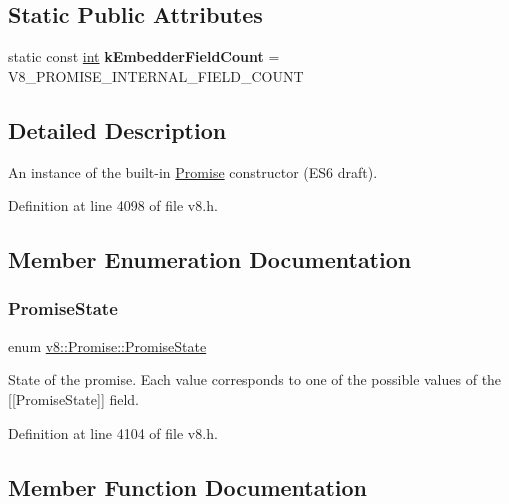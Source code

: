 \subsection*{Static Public Attributes}
\begin{DoxyCompactItemize}
\item 
\mbox{\label{classv8_1_1Promise_ab4302ae258f4405f871e24ec4b0ce618}} 
static const \mbox{\hyperlink{classint}{int}} {\bfseries k\+Embedder\+Field\+Count} = V8\+\_\+\+P\+R\+O\+M\+I\+S\+E\+\_\+\+I\+N\+T\+E\+R\+N\+A\+L\+\_\+\+F\+I\+E\+L\+D\+\_\+\+C\+O\+U\+NT
\end{DoxyCompactItemize}


\subsection{Detailed Description}
An instance of the built-\/in \mbox{\hyperlink{classv8_1_1Promise}{Promise}} constructor (E\+S6 draft). 

Definition at line 4098 of file v8.\+h.



\subsection{Member Enumeration Documentation}
\mbox{\label{classv8_1_1Promise_a0c357b9d99a634f98a5a203b0a322544}} 
\subsubsection{\texorpdfstring{Promise\+State}{PromiseState}}
{\footnotesize\ttfamily enum \mbox{\hyperlink{classv8_1_1Promise_a0c357b9d99a634f98a5a203b0a322544}{v8\+::\+Promise\+::\+Promise\+State}}}

State of the promise. Each value corresponds to one of the possible values of the \mbox{[}\mbox{[}Promise\+State\mbox{]}\mbox{]} field. 

Definition at line 4104 of file v8.\+h.



\subsection{Member Function Documentation}
\mbox{\label{classv8_1_1Promise_aca18f9f798a1a15ab5523e44d332e8af}} 
